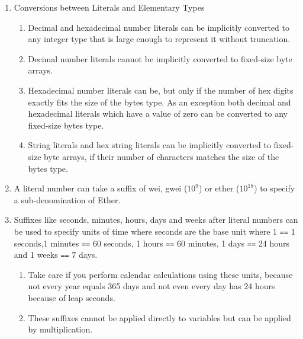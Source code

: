 \begin{enumerate}
\item Conversions between Literals and Elementary Types
    \begin{enumerate}
    \item Decimal and hexadecimal number literals can be implicitly converted to any integer type that is large enough to represent it without truncation.
    \item Decimal number literals cannot be implicitly converted to fixed-size byte arrays.
    \item Hexadecimal number literals can be, but only if the number of hex digits exactly fits the size of the bytes type. As an exception both decimal and hexadecimal literals which have a value of zero can be converted to any fixed-size bytes type.
    \item String literals and hex string literals can be implicitly converted to fixed-size byte arrays, if their number of characters matches the size of the bytes type.
    \end{enumerate}

\item A literal number can take a suffix of wei, gwei ($10^9$) or ether ($10^{18}$) to specify a sub-denomination of Ether.

\item Suffixes like seconds, minutes, hours, days and weeks after literal numbers can be used to specify units of time where seconds are the base unit where 1 \verb|==| 1 seconds,1 minutes \verb|==| 60 seconds, 1 hours \verb|==| 60 minutes, 1 days \verb|==| 24 hours and 1 weeks \verb|==| 7 days.
    \begin{enumerate}
    \item Take care if you perform calendar calculations using these units, because not every year equals 365 days and not even every day has 24 hours because of leap seconds.
    \item These suffixes cannot be applied directly to variables but can be applied by multiplication.
    \end{enumerate}


\end{enumerate}
